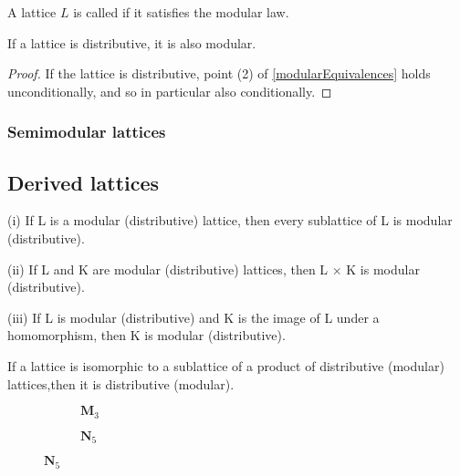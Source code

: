 \begin{definition}
A lattice $L$ is called  if it satisfies the modular law.
\end{definition}

\begin{lemma}
If a lattice is distributive, it is also modular.
\end{lemma}
\begin{proof}
If the lattice is distributive, point (2) of \ref{modularEquivalences} holds unconditionally, and so in particular also conditionally.
\end{proof}

\subsubsection{Semimodular lattices}


\subsection{Derived lattices}
\begin{proposition}
(i) If L is a modular (distributive) lattice, then every sublattice of L
is modular (distributive).

(ii) If L and K are modular (distributive) lattices, then L × K is
modular (distributive).

(iii) If L is modular (distributive) and K is the image of L under a
homomorphism, then K is modular (distributive).
\end{proposition}
\begin{corollary}
If a lattice is isomorphic to a sublattice of a product
of distributive (modular) lattices,then it is distributive (modular).
\end{corollary}

\begin{figure}
     \centering
     \begin{subfigure}[b]{0.4\textwidth}
     \centering
{}
\caption{$\mathbf{M}_3$}
     \end{subfigure}
     \hfill
     \begin{subfigure}[b]{0.4\textwidth}
         \centering
{}
         \caption{$\mathbf{N}_5$}
     \end{subfigure}
\end{figure}


